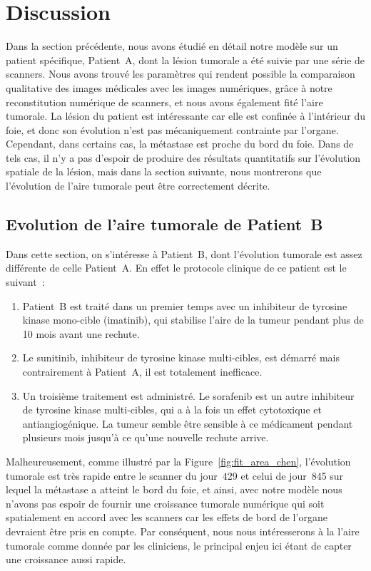 \documentclass[11pt]{amsart}
\numberwithin{equation}{section}
\newcommand{\Nber}{Patient~A\xspace}
\newcommand{\Chen}{Patient~B\xspace}
\begin{document}
\section{Discussion}
Dans la section précédente, nous avons étudié en détail notre modèle sur un patient spécifique, \Nber, dont la lésion tumorale a été suivie par une série de scanners. Nous avons trouvé les paramètres qui rendent possible la comparaison qualitative des images médicales avec les images numériques, grâce à notre reconstitution numérique de scanners, et nous avons également fité l'aire tumorale. La lésion du patient est intéressante car elle est confinée à l'intérieur du foie, et donc son évolution n'est pas mécaniquement contrainte par l'organe. 
Cependant, dans certains cas, la métastase est proche du bord du foie. Dans de tels cas, il n'y a pas d'espoir de produire des résultats quantitatifs sur l'évolution spatiale de la lésion, mais dans la section suivante, nous montrerons que l'évolution de l'aire tumorale peut être correctement décrite.
\subsection{Evolution de l'aire tumorale de \Chen}\label{section chen}
Dans cette section, on s'intéresse à \Chen, dont l'évolution tumorale est assez différente de celle \Nber. En effet le protocole clinique de ce patient est le suivant~:
\begin{enumerate}[label=\roman*)]
\item \Chen est traité dans un premier temps avec un inhibiteur de tyrosine kinase mono-cible (imatinib), qui stabilise l'aire de la tumeur pendant plus de 10 mois avant une rechute. 
\item Le sunitinib, inhibiteur de tyrosine kinase multi-cibles, est démarré mais contrairement à \Nber, il est totalement inefficace. 
\item Un troisième traitement est administré. Le sorafenib est un autre inhibiteur de tyrosine kinase multi-cibles, qui a à la fois un effet cytotoxique et antiangiogénique. La tumeur semble être sensible à ce médicament pendant plusieurs mois jusqu'à ce qu'une nouvelle rechute arrive. 
\end{enumerate}
Malheureusement, comme illustré par la Figure~\ref{fig:fit_area_chen}, l'évolution tumorale est très rapide entre le scanner du jour~429 et celui de jour~845 sur lequel la métastase a atteint le bord du foie, et ainsi, avec notre modèle nous n'avons pas espoir de fournir une croissance tumorale numérique qui soit spatialement en accord avec les scanners car les effets de bord de l'organe devraient être pris en compte. Par conséquent, nous nous intéresserons à la l'aire tumorale comme donnée par les cliniciens, le principal enjeu ici étant de capter une croissance aussi rapide. 
\end{document}
